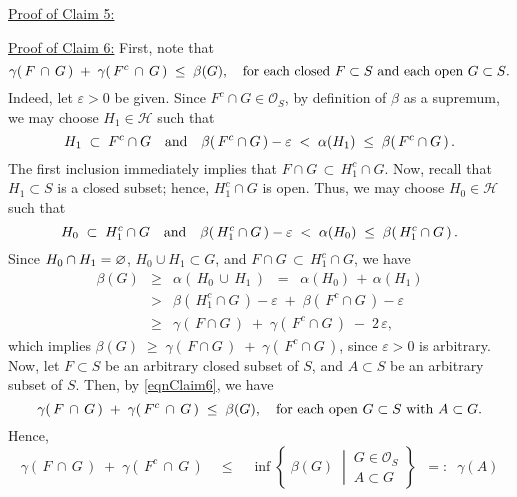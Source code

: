 \vskip 0.5cm
\noindent
\underline{Proof of Claim 5:}\quad

\vskip 0.5cm
\noindent
\underline{Proof of Claim 6:}\quad
First, note that
\begin{equation}
\label{eqnClaim6}
\gamma(\,F\,\cap\,G\,) \;+\; \gamma(\,F^{c}\,\cap\,G\,) \;\leq\; \beta(G),
\quad
\textnormal{for each closed $F \subset S$ and each open $G \subset S$}.
\end{equation}
Indeed, let $\varepsilon > 0$ be given.
Since $F^{c}\cap G \in \mathcal{O}_{S}$, by definition of $\beta$ as a supremum,
we may choose $H_{1} \in \mathcal{H}$ such that
\begin{equation*}
H_{1}\;\subset\;F^{c}\cap G
\quad\textnormal{and}\quad
\beta\!\left(\,F^{c}\cap G\,\right) - \varepsilon \;<\; \alpha(H_{1}) \;\leq\; \beta\!\left(\,F^{c}\cap G\,\right).
\end{equation*}
The first inclusion immediately implies that $F\cap G \,\subset\, H_{1}^{c}\cap G$.
Now, recall that $H_{1} \subset S$ is a closed subset; hence, $H_{1}^{c}\cap G$ is open.
Thus, we may choose $H_{0} \in \mathcal{H}$ such that
\begin{equation*}
H_{0}\;\subset\;H_{1}^{c}\cap G
\quad\textnormal{and}\quad
\beta\!\left(\,H_{1}^{c}\cap G\,\right) - \varepsilon \;<\; \alpha(H_{0}) \;\leq\; \beta\!\left(\,H_{1}^{c}\cap G\,\right).
\end{equation*}
Since $H_{0}\cap H_{1} = \varnothing$, $H_{0} \cup H_{1} \subset G$, and
$F\cap G \,\subset\, H_{1}^{c}\cap G$, we have
\begin{eqnarray*}
\beta(G)
&\geq& \alpha\!\left(\,H_{0}\,\cup\,H_{1}\,\right)
\;\;=\;\; \alpha(H_{0})\,+\,\alpha(H_{1})
\\
& > & \beta\!\left(\,H_{1}^{c}\cap G\,\right) - \varepsilon \;+\; \beta\!\left(\,F^{c}\cap G\,\right) - \varepsilon
\\
&\geq& \gamma\!\left(\,F\cap G\,\right) \;+\; \gamma\!\left(\,F^{c}\cap G\,\right) \;-\; 2\,\varepsilon,
\end{eqnarray*}
which implies $\beta(G) \;\geq\; \gamma\!\left(\,F\cap G\,\right) \;+\; \gamma\!\left(\,F^{c}\cap G\,\right)$,
since $\varepsilon > 0$ is arbitrary.
\vskip 0.3cm
\noindent
Now, let $F \subset S$ be an arbitrary closed subset of $S$, and $A \subset S$ be an arbitrary subset of $S$.
Then, by \eqref{eqnClaim6}, we have
\begin{equation*}
\gamma(\,F\,\cap\,G\,) \;+\; \gamma(\,F^{c}\,\cap\,G\,) \;\leq\; \beta(G),
\quad
\textnormal{for each open $G \subset S$ with $A \subset G$}.
\end{equation*}
Hence,
\begin{equation*}
\gamma(\,F\,\cap\,G\,) \;+\; \gamma(\,F^{c}\,\cap\,G\,)
\quad\leq\quad
\inf\left\{\;
\beta(G)
\;\;\left\vert\,
\begin{array}{c} G \in \mathcal{O}_{S} \\ A \subset G \end{array}
\right.
\right\}
\;\; =: \;\; \gamma(A)
\end{equation*}

